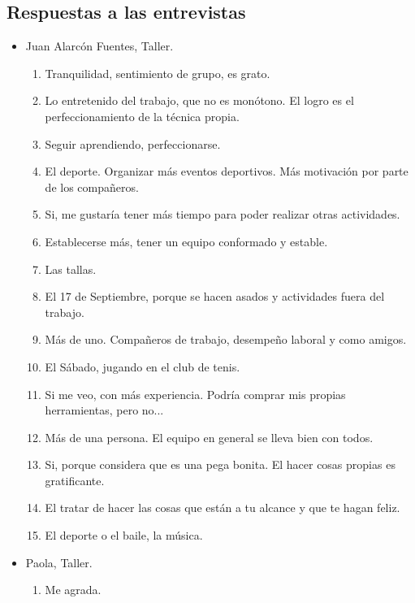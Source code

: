 
\subsection{Respuestas a las entrevistas}

\begin{itemize}
    \item Juan Alarcón Fuentes, Taller.
    \begin{enumerate}
        \item Tranquilidad, sentimiento de grupo, es grato.
        \item Lo entretenido del trabajo, que no es monótono. El logro es el
        perfeccionamiento de la técnica propia.
        \item Seguir aprendiendo, perfeccionarse.
        \item El deporte. Organizar más eventos deportivos. Más motivación por
        parte de los compañeros.
        \item Si, me gustaría tener más tiempo para poder realizar otras
        actividades.
        \item Establecerse más, tener un equipo conformado y estable.
        \item Las tallas.
        \item El 17 de Septiembre, porque se hacen asados y actividades fuera
        del trabajo.
        \item Más de uno. Compañeros de trabajo, desempeño laboral y como
        amigos.
        \item El Sábado, jugando en el club de tenis.
        \item Si me veo, con más experiencia. Podría comprar mis propias
        herramientas, pero no...
        \item Más de una persona. El equipo en general se lleva bien con
        todos.
        \item Si, porque considera que es una pega bonita. El hacer cosas
        propias es gratificante.
        \item El tratar de hacer las cosas que están a tu alcance y que te
        hagan feliz.
        \item El deporte o el baile, la música.
    \end{enumerate}
    \item  Paola, Taller.
    \begin{enumerate}
        \item Me agrada.

\end{enumerate}
\end{itemize}
